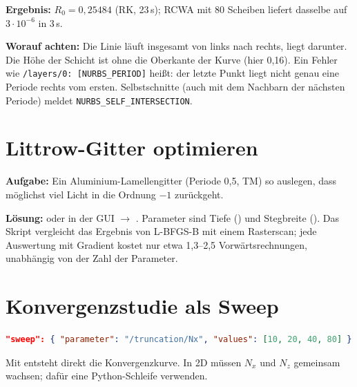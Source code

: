 \textbf{Ergebnis:} $R_0=0{,}25484$ (RK, 23\,s); RCWA mit 80 Scheiben liefert dasselbe auf $3\cdot10^{-6}$ in 3\,s.

\textbf{Worauf achten:} Die Linie läuft insgesamt von links nach rechts,  liegt darunter. Die Höhe der
Schicht ist ohne  die Oberkante der Kurve (hier 0,16\um). Ein Fehler wie
\texttt{/layers/0: [NURBS\_PERIOD]} heißt: der letzte Punkt liegt nicht genau eine Periode rechts vom ersten.
Selbstschnitte (auch mit dem Nachbarn der nächsten Periode) meldet \texttt{NURBS\_SELF\_INTERSECTION}.

\section{Littrow-Gitter optimieren}
%
\textbf{Aufgabe:} Ein Aluminium-Lamellengitter (Periode 0,5\um, TM) so auslegen, dass möglichst viel Licht in die
Ordnung $-1$ zurückgeht.

\textbf{Lösung:}  oder in der GUI  $\to$
. Parameter sind Tiefe () und Stegbreite
(). Das Skript vergleicht das Ergebnis von L-BFGS-B mit einem Rasterscan; jede
Auswertung mit Gradient kostet nur etwa 1,3--2,5 Vorwärtsrechnungen, unabhängig von der Zahl der Parameter.

\section{Konvergenzstudie als Sweep}
%
\begin{lstlisting}[language=json]
"sweep": { "parameter": "/truncation/Nx", "values": [10, 20, 40, 80] }
\end{lstlisting}
Mit  entsteht direkt die Konvergenzkurve. In 2D müssen $N_x$ und
$N_z$ gemeinsam wachsen; dafür eine Python-Schleife verwenden.
